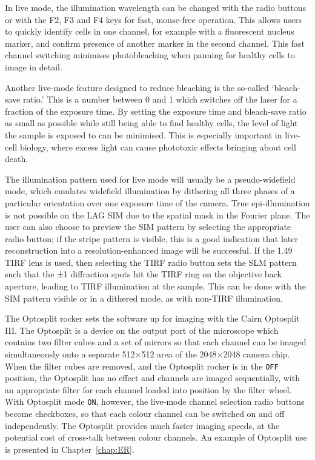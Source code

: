 In live mode, the illumination wavelength can be changed with the radio buttons or with the F2, F3 and F4 keys for fast, mouse-free operation. 
This allows users to quickly identify cells in one channel, for example with a fluorescent nucleus marker, and confirm presence of another marker in the second channel.
This fast channel switching minimises photobleaching when panning for healthy cells to image in detail. 

Another live-mode feature designed to reduce bleaching is the so-called `bleach-save ratio.' 
This is a number between 0 and 1 which switches off the laser for a fraction of the exposure time. 
By setting the exposure time and bleach-save ratio as small as possible while still being able to find healthy cells, the level of light the sample is exposed to can be minimised.
This is especially important in live-cell biology, where excess light can cause phototoxic effects bringing about cell death. 

The illumination pattern used for live mode will usually be a pseudo-widefield mode, which emulates widefield illumination by dithering all three phases of a particular orientation over one exposure time of the camera. 
True epi-illumination is not possible on the LAG SIM due to the spatial mask in the Fourier plane. 
The user can also choose to preview the SIM pattern by selecting the appropriate radio button; if the stripe pattern is visible, this is a good indication that later reconstruction into a resolution-enhanced image will be successful. 
If the \SI{1.49}{\numaperture} TIRF lens is used, then selecting the TIRF radio button sets the SLM pattern such that the ±1 diffraction spots hit the TIRF ring on the objective back aperture, leading to TIRF illumination at the sample. 
This can be done with the SIM pattern visible or in a dithered mode, as with non-TIRF illumination. 

The Optosplit rocker sets the software up for imaging with the Cairn Optosplit III. 
The Optosplit is a device on the output port of the microscope which contains two filter cubes and a set of mirrors so that each channel can be imaged simultaneously onto a separate 512$\times$512 area of the 2048$\times$2048 camera chip.
When the filter cubes are removed, and the Optosplit rocker is in the \texttt{OFF} position, the Optosplit has no effect and channels are imaged sequentially, with an appropriate filter for each channel loaded into position by the filter wheel. 
With Optosplit mode \texttt{ON}, however, the live-mode channel selection radio buttons become checkboxes, so that each colour channel can be switched on and off independently. 
The Optosplit provides much faster imaging speeds, at the potential cost of cross-talk between colour channels. 
An example of Optosplit use is presented in Chapter~\ref{chap:ER}. %


